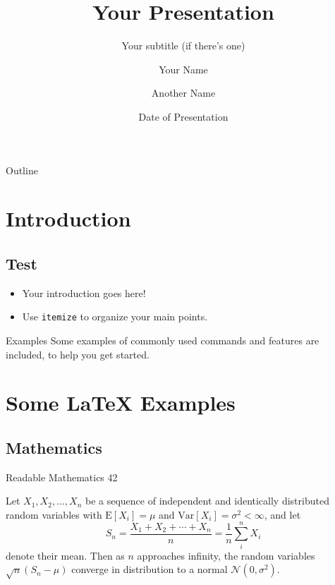 \documentclass[
  10pt,
  aspectratio=169,
  xcolor={dvipsnames,table,x11names},  %
]{beamer}
\title[Your Short Title]{Your Presentation}
\subtitle{Your subtitle (if there's one)}
\author[\MakeUppercase{Your name (short)}]{Your Name \and Another Name}  %
\institute{Your Faculty/Department}
\date{Date of Presentation}
\begin{document}
{  %
\begin{frame}  %
  \titlepage
\end{frame}
}


\begin{frame}{Outline}
  \hypersetup{linkcolor=black}
  \tableofcontents[sectionstyle=shaded/show, hideallsubsections]
\end{frame}

\section{Introduction}
  \subsection{Test}

\begin{frame}%

\begin{itemize}
  \item Your introduction goes here!
  \item Use \texttt{itemize} to organize your main points.
\end{itemize}

\begin{block}{Examples}
Some examples of commonly used commands and features are included, to help you get started.
\end{block}

\end{frame}

\section{Some \LaTeX{} Examples}

\subsection{Mathematics}

\begin{frame}{Readable Mathematics 42}

Let $X_1, X_2, \ldots, X_n$ be a sequence of independent and identically distributed random variables with $\text{E}[X_i] = \mu$ and $\text{Var}[X_i] = \sigma^2 < \infty$, and let
$$S_n = \frac{X_1 + X_2 + \cdots + X_n}{n}
      = \frac{1}{n}\sum_{i}^{n} X_i$$
denote their mean. Then as $n$ approaches infinity, the random variables $\sqrt{n}(S_n - \mu)$ converge in distribution to a normal $\mathcal{N}(0, \sigma^2)$.

\end{frame}
\end{document}
